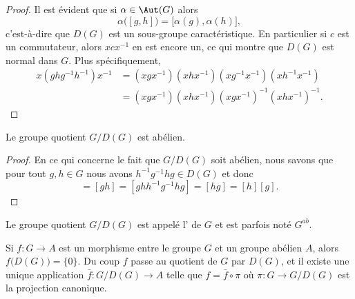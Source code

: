\begin{proof}
	Il est évident que si \( \alpha\in\Aut(G)\) alors
	\begin{equation}
		\alpha\big( [g,h] \big)=\big[ \alpha(g),\alpha(h) \big],
	\end{equation}
	c'est-à-dire que \( D(G)\) est un sous-groupe caractéristique. En particulier si \( c\) est un commutateur, alors \( xcx^{-1}\) en est encore un, ce qui montre que \( D(G)\) est normal dans \( G\). Plus spécifiquement,
	\begin{subequations}
		\begin{align}
			x(ghg^{-1}h^{-1})x^{-1} & =(xgx^{-1})(xhx^{-1})(xg^{-1}x^{-1})(xh^{-1}x^{-1})  \\
			                        & =(xgx^{-1})(xhx^{-1})(xgx^{-1})^{-1}(xhx^{-1})^{-1}.
		\end{align}
	\end{subequations}
\end{proof}

\begin{proposition}\label{PropAPRGooHBkELf}
	Le groupe quotient \( G/D(G)\) est abélien.
\end{proposition}

\begin{proof}
	En ce qui concerne le fait que \( G/D(G)\) soit abélien, nous savons que pour tout \( g,h\in G\) nous avons \( h^{-1}g^{-1}hg\in D(G)\) et donc
	\begin{equation}
		[g][h]=[gh]=[ghh^{-1}g^{-1}hg]=[hg]=[h][g].
	\end{equation}
\end{proof}

Le groupe quotient \( G/D(G)\) est appelé l' de \( G\) et est parfois noté \( G^{ab}\).

Si \( f\colon G\to A\) est un morphisme entre le groupe \( G\) et un groupe abélien \( A\), alors \( f\big( D(G) \big)=\{ 0 \}\). Du coup \( f\) passe au quotient de \( G\) par \( D(G)\), et il existe une unique application \( \bar f\colon G/D(G)\to A\) telle que \( f=\bar f\circ \pi\) où \( \pi\colon G\to G/D(G)\) est la projection canonique.
